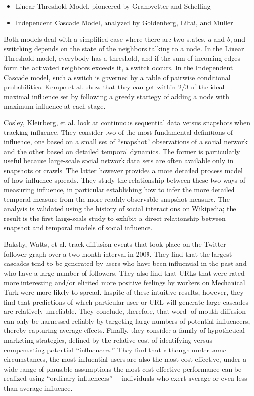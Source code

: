 \documentclass[10pt,oneside]{memoir}
\begin{document}
\begin{Spacing}{2}
\begin{itemize}


\item Linear Threshold Model, pioneered by Granovetter and Schelling

\item Independent Cascade Model, analyzed by Goldenberg, Libai, and Muller
\end{itemize}

Both models deal with a simplified case where there are two states, $a$ and $b$, and switching depends on the state of the neighbors talking to a node.  In the Linear Threshold model, everybody has a threshold, and if the sum of incoming edges form the activated neighbors exceeds it, a switch occurs.  In the Independent Cascade model, such a switch is governed by a table of pairwise conditional probabilities.  Kempe et al. show that they can get within 2/3 of the ideal maximal influence set by following a greedy startegy of adding a node with maximum influence at each stage. 


Cosley, Kleinberg, et al. look at continuous sequential data versus snapshots when tracking influence.   They consider two of the most fundamental definitions of influence, one based on a small set of ``snapshot'' observations of a social network and the other based on detailed temporal dynamics. The former is particularly useful because large-scale social network data sets are often available only in snapshots or crawls. The latter however provides a more detailed process model of how influence spreads. They study the relationship between these two ways of measuring influence, in particular establishing how to infer the more detailed temporal measure from the more readily observable snapshot measure. The analysis is validated using the history of social interactions on Wikipedia; the result is the first large-scale study to exhibit a direct relationship between snapshot and temporal models of social influence.


Bakshy, Watts, et al. \cite{bakshy2011everyone} track diffusion events that took place on the Twitter follower graph over a two month interval in 2009. They find that the largest cascades tend to be generated by users who have been influential in the past and who have a large number of followers. They also find that URLs that were rated more interesting and/or elicited more positive feelings by workers on Mechanical Turk were more likely to spread. Inspite of these intuitive results, however, they find that predictions of which particular user or URL will generate large cascades are relatively unreliable. They conclude, therefore, that word- of-mouth diffusion can only be harnessed reliably by targeting large numbers of potential influencers, thereby capturing average effects. Finally, they consider a family of hypothetical marketing strategies, defined by the relative cost of identifying versus compensating potential ``influencers.'' They find that although under some circumstances, the most influential users are also the most cost-effective, under a wide range of plausible assumptions the most cost-effective performance can be realized using ``ordinary influencers''--- individuals who exert average or even less-than-average influence.



\end{Spacing}
\end{document}
